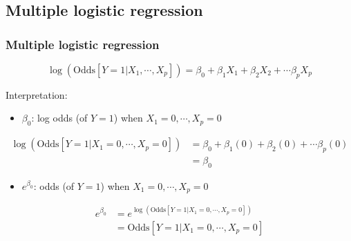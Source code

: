 \documentclass[10pt,t]{beamer}
\begin{document}
\subsection{Multiple logistic regression}
\begin{frame}
	\frametitle{Multiple logistic regression}
	\vspace{-1.5cm}
	$$\log\left(\text{Odds}[Y =1 |X_1,\cdots,X_p]\right) = \beta_0 + \beta_1 X_1 + \beta_2X_2 + \cdots \beta_p X_p$$
	
	\color{blue} Interpretation: \color{black}
	\begin{itemize}  \color{red}
		\item $\beta_0$:   log odds (of $Y=1$) when $X_1 = 0, \cdots, X_p = 0$  
	\end{itemize}
	\vspace{-0.3cm}
	\begin{footnotesize}
		\begin{align*}
			\log\left(\text{Odds}[Y =1 |X_1=0,\cdots,X_p=0]\right) & = \beta_0 + \beta_1 (0) + \beta_2(0) + \cdots \beta_p (0) \\
			& = \beta_0 
		\end{align*}  
	\end{footnotesize}
	
	\vspace{-0.6cm}
	\begin{itemize}   \color{red}
		\item $e^{\beta_0}$:   odds (of $Y=1$) when $X_1 = 0, \cdots, X_p = 0$  
	\end{itemize}
	\vspace{-0.3cm}
	\begin{footnotesize}
		\begin{align*}
			e^{\beta_0} & = e^{\log\left(\text{Odds}[Y =1 |X_1=0,\cdots,X_p=0]\right)} \\
			& = \text{Odds}[Y =1 |X_1=0,\cdots,X_p=0]
		\end{align*}
	\end{footnotesize}
\end{frame}
\end{document}
